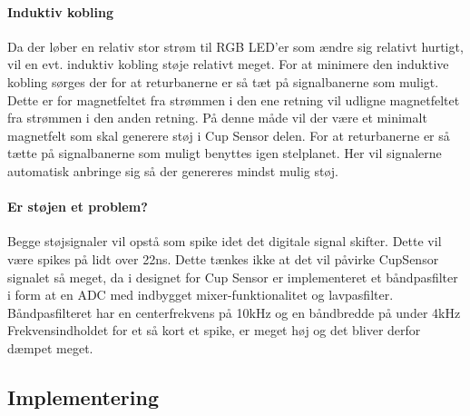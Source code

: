 \documentclass[HardwareDesign/HardwareDesign_main.tex]{subfiles}
\begin{document}
\paragraph{Induktiv kobling} Da der løber en relativ stor strøm til RGB LED'er som ændre sig relativt hurtigt, vil en evt. induktiv kobling støje relativt meget. For at minimere den induktive kobling sørges der for at returbanerne er så tæt på signalbanerne som muligt. Dette er for magnetfeltet fra strømmen i den ene retning vil udligne magnetfeltet fra strømmen i den anden retning. På denne måde vil der være et minimalt magnetfelt som skal generere støj i Cup Sensor delen. For at returbanerne er så tætte på signalbanerne som muligt benyttes igen stelplanet. Her vil signalerne automatisk anbringe sig så der genereres mindst mulig støj.

\paragraph{Er støjen et problem?}
Begge støjsignaler vil opstå som spike idet det digitale signal skifter. Dette vil være spikes på lidt over 22ns. Dette tænkes ikke at det vil påvirke CupSensor signalet så meget, da i designet for Cup Sensor er implementeret et båndpasfilter i form at en ADC med indbygget mixer-funktionalitet og lavpasfilter. Båndpasfilteret har en centerfrekvens på 10kHz og en båndbredde på under 4kHz Frekvensindholdet for et så kort et spike, er meget høj og det bliver derfor dæmpet meget.

\subsection{Implementering}
\end{document}
